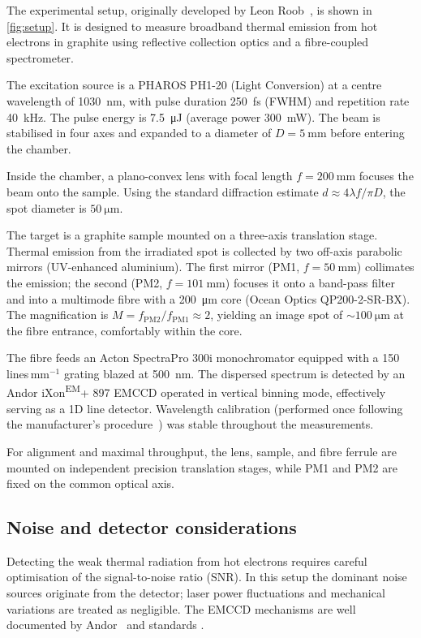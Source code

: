 \documentclass[
	a4paper,
]{scrarticle}
\begin{document}
The experimental setup, originally developed by Leon Roob~\cite{roobThermalRadiationUltrafast2025}, is shown in \autoref{fig:setup}. It is designed to measure broadband thermal emission from hot electrons in graphite using reflective collection optics and a fibre-coupled spectrometer.

The excitation source is a PHAROS PH1-20 (Light Conversion) at a centre wavelength of \SI{1030}{\nano\metre}, with pulse duration \SI{250}{\femto\second} (FWHM) and repetition rate \SI{40}{\kilo\hertz}. The pulse energy is \SI{7.5}{\micro\joule} (average power \SI{300}{\milli\watt}). The beam is stabilised in four axes and expanded to a diameter of $D=\SI{5}{\milli\metre}$ before entering the chamber.

Inside the chamber, a plano-convex lens with focal length \(f=\SI{200}{\milli\metre}\) focuses the beam onto the sample. Using the standard diffraction estimate \(d \approx 4\lambda f / \pi D\), the spot diameter is \(\SI{50}{\micro\metre}\).

The target is a graphite sample mounted on a three-axis translation stage. Thermal emission from the irradiated spot is collected by two off-axis parabolic mirrors (UV-enhanced aluminium). The first mirror (PM1, \(f=\SI{50}{\milli\metre}\)) collimates the emission; the second (PM2, \(f=\SI{101}{\milli\metre}\)) focuses it onto a band-pass filter and into a multimode fibre with a \SI{200}{\micro\metre} core (Ocean Optics QP200-2-SR-BX). The magnification is \(M = f_{\mathrm{PM2}}/f_{\mathrm{PM1}} \approx 2\), yielding an image spot of \(\sim\SI{100}{\micro\metre}\) at the fibre entrance, comfortably within the core.

The fibre feeds an Acton SpectraPro 300i monochromator equipped with a 150\,lines\,mm\(^{-1}\) grating blazed at \SI{500}{\nano\metre}. The dispersed spectrum is detected by an Andor iXon\textsuperscript{EM}+ 897 EMCCD operated in vertical binning mode, effectively serving as a 1D line detector.
Wavelength calibration (performed once following the manufacturer’s procedure~\cite{roobThermalRadiationUltrafast2025}) was stable throughout the measurements.

For alignment and maximal throughput, the lens, sample, and fibre ferrule are mounted on independent precision translation stages, while PM1 and PM2 are fixed on the common optical axis. 

\subsection{Noise and detector considerations}
Detecting the weak thermal radiation from hot electrons requires careful optimisation of the signal-to-noise ratio (SNR). In this setup the dominant noise sources originate from the detector; laser power fluctuations and mechanical variations are treated as negligible. The EMCCD mechanisms are well documented by Andor~\cite{dr.jowaltersSensitivityNoiseCCD2023,andorEstablishingSensitivityScientifica} and standards \cite{europeanmachinevisionassociationStandardCharacterizationImage2010}.
\end{document}

